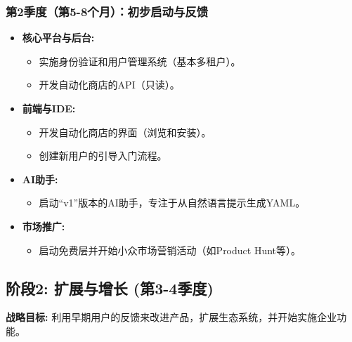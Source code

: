 \documentclass[11pt, a4paper, oneside]{article}
\begin{document}
\subsubsection*{第2季度（第5-8个月）：初步启动与反馈}
\begin{itemize}[leftmargin=*]
    \item \textbf{核心平台与后台:}
    \begin{itemize}
        \item 实施身份验证和用户管理系统（基本多租户）。
        \item 开发自动化商店的API（只读）。
    \end{itemize}
    \item \textbf{前端与IDE:}
    \begin{itemize}
        \item 开发自动化商店的界面（浏览和安装）。
        \item 创建新用户的引导入门流程。
    \end{itemize}
    \item \textbf{AI助手:}
    \begin{itemize}
        \item 启动“v1”版本的AI助手，专注于从自然语言提示生成YAML。
    \end{itemize}
    \item \textbf{市场推广:}
    \begin{itemize}
        \item 启动免费层并开始小众市场营销活动（如Product Hunt等）。
    \end{itemize}
\end{itemize}

\clearpage

\subsection{阶段2: 扩展与增长 (第3-4季度)}
\textbf{战略目标:} 利用早期用户的反馈来改进产品，扩展生态系统，并开始实施企业功能。
\end{document}
